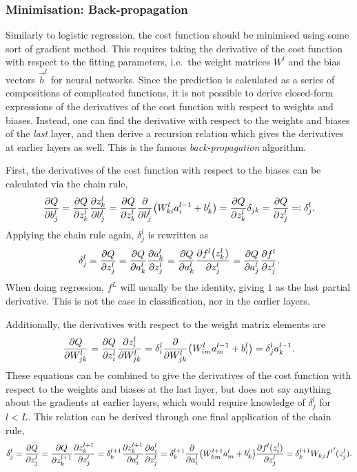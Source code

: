 \documentclass[11pt,british,a4paper]{article}
\numberwithin{equation}{section}
\begin{document}
\subsubsection{Minimisation: Back-propagation}
Similarly to logistic regression, the cost function should be minimised using some sort of gradient method.
This requires taking the derivative of the cost function with respect to the fitting parameters, i.e.\ the weight matrices \(W^l\) and the bias vectors \(\vec{b}^l\) for neural networks.
Since the prediction is calculated as a series of compositions of complicated functions, it is not possible to derive closed-form expressions of the derivatives of the cost function with respect to weights and biases.
Instead, one can find the derivative with respect to the weights and biases of the \emph{last} layer, and then derive a recursion relation which gives the derivatives at earlier layers as well. This is the famous \emph{back-propagation} algorithm.

First, the derivatives of the cost function with respect to the biases can be calculated via the chain rule,
\begin{equation}
    \pdv{Q}{b_j^l} = \pdv{Q}{z_k^l}\pdv{z_k^l}{b_j^l} = \pdv{Q}{z_k^l}\pdv{b_j^l}(W_{ki}^l a_i^{l-1} + b_k^l) = \pdv{Q}{z_k^l}\delta_{jk}
    = \pdv{Q}{z_j^l} \eqqcolon \delta_j^l.
\end{equation}
Applying the chain rule again, \(\delta_j^l\) is rewritten as
\begin{equation}
    \delta_j^l = \pdv{Q}{z_j^l} = \pdv{Q}{a_k^l}\pdv{a_k^l}{z_j^l} = \pdv{Q}{a_k^l}\pdv{f^l\qty(z_k^l)}{z_j^l}
               = \pdv{Q}{a_j^l}\pdv{f^l}{z_j^l}.
\end{equation}
When doing regression, \(f^L\) will usually be the identity, giving \(1\) as the last partial derivative. This is not the case in classification, nor in the earlier layers.

Additionally, the derivatives with respect to the weight matrix elements are
\begin{equation}
    \pdv{Q}{W_{jk}^l} = \pdv{Q}{z_i^l}\pdv{z_i^l}{W_{jk}^l} = \delta_i^l \pdv{W_{jk}^l}\qty(W_{im}^l a_m^{l-1} + b_i^l)
                      = \delta_j^l a_k^{l-1}.
\end{equation}
These equations can be combined to give the derivatives of the cost function with respect to the weights and biases at the last layer, but does not say anything about the gradients at earlier layers, which would require knowledge of \(\delta_j^l\) for \(l<L\).
This relation can be derived through one final application of the chain rule,
\begin{equation}
    \delta_j^l = \pdv{Q}{z_j^l} = \pdv{Q}{z_k^{l+1}}\pdv{z_k^{l+1}}{z_j^l}
               = \delta_k^{l+1} \pdv{z_k^{l+1}}{a_i^l}\pdv{a_i^l}{z_j^{l}}
               = \delta_k^{l+1} \pdv{a_i^l}\qty(W_{km}^{l+1}a_m^l + b_k^l) \pdv{f^l(z_i^l)}{z_j^{l}}
               = \delta_k^{l+1} W_{kj} {f^l} '(z_j^l).
\end{equation}
\end{document}
